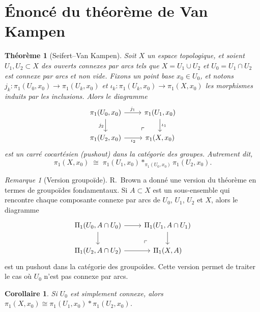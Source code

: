 \documentclass[12pt,a4paper,openany]{book}
\theoremstyle{definition}
\theoremstyle{plain}
\newtheorem{theoreme}[definition]{Théorème}
\newtheorem{corollaire}[definition]{Corollaire}
\theoremstyle{remark}
\newtheorem{remarque}[definition]{Remarque}
\begin{document}
\section{Énoncé du théorème de Van Kampen}\label{sec:enonce-vk}

\begin{theoreme}[{Seifert--Van Kampen}]\label{thm:van-kampen}
Soit $X$ un espace topologique, et soient $U_1, U_2 \subset X$ des ouverts connexes par arcs
tels que $X = U_1 \cup U_2$ et $U_0 = U_1 \cap U_2$ est connexe par arcs et non vide.
Fixons un point base $x_0 \in U_0$, et notons $j_k \colon \pi_1(U_0, x_0) \to \pi_1(U_k, x_0)$
et $\iota_k \colon \pi_1(U_k, x_0) \to \pi_1(X, x_0)$ les morphismes induits par les inclusions.
Alors le diagramme
\[
\begin{tikzcd}
\pi_1(U_0, x_0) \arrow[r, "j_1"] \arrow[d, "j_2"'] & \pi_1(U_1, x_0) \arrow[d, "\iota_1"] \\
\pi_1(U_2, x_0) \arrow[r, "\iota_2"'] & \pi_1(X, x_0)
\arrow[ul, phantom, "\ulcorner" very near start]
\end{tikzcd}
\]
est un carré cocartésien (pushout) dans la catégorie des groupes. Autrement dit,
\[
\pi_1(X, x_0) \;\cong\; \pi_1(U_1, x_0) *_{\pi_1(U_0, x_0)} \pi_1(U_2, x_0).
\]
\end{theoreme}

\begin{remarque}[Version groupoïde]\label{rem:vk-groupoide}
R.~Brown a donné une version du théorème en termes de groupoïdes fondamentaux.
Si $A \subset X$ est un sous-ensemble qui rencontre chaque composante connexe par arcs de
$U_0$, $U_1$, $U_2$ et $X$, alors le diagramme
\[
\begin{tikzcd}
\Pi_1(U_0, A \cap U_0) \arrow[r] \arrow[d] & \Pi_1(U_1, A \cap U_1) \arrow[d] \\
\Pi_1(U_2, A \cap U_2) \arrow[r] & \Pi_1(X, A)
\arrow[ul, phantom, "\ulcorner" very near start]
\end{tikzcd}
\]
est un pushout dans la catégorie des groupoïdes. Cette version permet de traiter le cas
où $U_0$ n'est pas connexe par arcs.
\end{remarque}

\begin{corollaire}\label{cor:vk-trivial}
Si $U_0$ est simplement connexe, alors
$\pi_1(X, x_0) \cong \pi_1(U_1, x_0) * \pi_1(U_2, x_0)$.
\end{corollaire}
\end{document}
